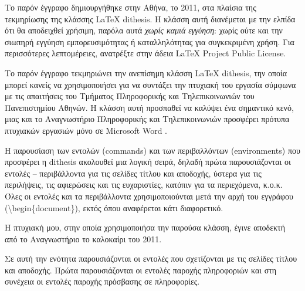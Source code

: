 \documentclass[english]{dithesis} %
\begin{document}
\begin{thesisprologue}
  Το παρόν έγγραφο δημιουργήθηκε στην Αθήνα, το 2011, στα πλαίσια της
  τεκμηρίωσης της κλάσσης \LaTeX{} dithesis.
  Η κλάσση αυτή διανέμεται με την ελπίδα ότι θα αποδειχθεί χρήσιμη, παρόλα αυτά
  \emph{χωρίς καμιά εγγύηση}: χωρίς ούτε και την σιωπηρή εγγύηση
  εμπορευσιμότητας ή καταλληλότητας για συγκεκριμένη χρήση.
  Για περισσότερες λεπτομέρειες, ανατρέξτε στην άδεια LaTeX Project Public
  License.
\end{thesisprologue}

Το παρόν έγγραφο τεκμηριώνει την ανεπίσημη κλάσση \LaTeX{} dithesis, την οποία
μπορεί κανείς να χρησιμοποιήσει για να συντάξει την πτυχιακή του εργασία
σύμφωνα με τις απαιτήσεις του Τμήματος Πληροφορικής και Τηλεπικοινωνιών του
Πανεπιστημίου Αθηνών.
Η κλάσση αυτή προσπαθεί να καλύψει ένα σημαντικό κενό, μιας και το Αναγνωστήριο
Πληροφορικής και Τηλεπικοινωνιών προσφέρει πρότυπα πτυχιακών εργασιών μόνο σε
Microsoft Word \cite{Anagnostirio}.

Η παρουσίαση των εντολών (commands) και των περιβαλλόντων (environments) που
προσφέρει η dithesis ακολουθεί μια λογική σειρά, δηλαδή πρώτα παρουσιάζονται οι
 εντολές -- περιβάλλοντα για τις σελίδες τίτλου και αποδοχής, ύστερα για τις
περιλήψεις, τις αφιερώσεις και τις ευχαριστίες, κατόπιν για τα περιεχόμενα,
κ.ο.κ.
Όλες οι εντολές και τα περιβάλλοντα χρησιμοποιούνται μετά την αρχή του
εγγράφου (\textbackslash{begin}\{document\}), εκτός όπου αναφέρεται κάτι
διαφορετικό.

H πτυχιακή μου, στην οποία χρησιμοποιήσα την παρούσα κλάσση, έγινε αποδεκτή
από το Αναγνωστήριο το καλοκαίρι του 2011.

Σε αυτή την ενότητα παρουσιάζονται οι εντολές που σχετίζονται με τις σελίδες
τίτλου και αποδοχής.
Πρώτα παρουσιάζονται οι εντολές παροχής πληροφοριών και στη συνέχεια οι εντολές
παροχής πρόσβασης σε πληροφορίες.
\end{document}
